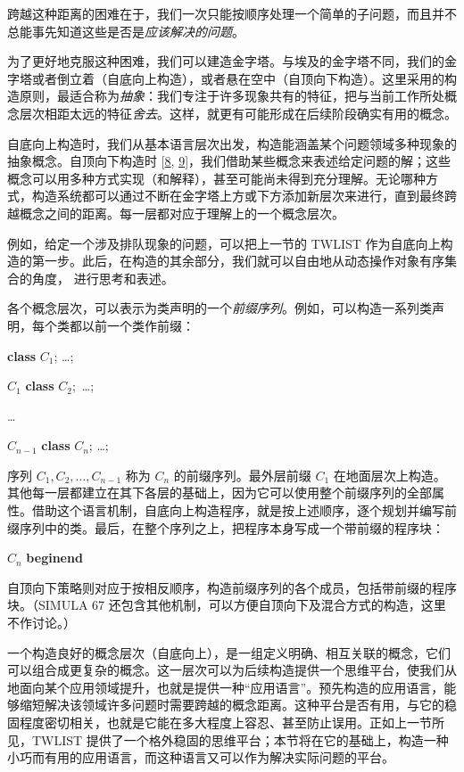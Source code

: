跨越这种距离的困难在于，我们一次只能按顺序处理一个简单的子问题，而且并不总能事先知道这些是否是\textit{应该解决的问题}。

为了更好地克服这种困难，我们可以建造金字塔。与埃及的金字塔不同，我们的金字塔或者倒立着（自底向上构造），或者悬在空中（自顶向下构造）。这里采用的构造原则，最适合称为\textit{抽象}：我们专注于许多现象共有的特征，把与当前工作所处概念层次相距太远的特征\textit{舍去}。这样，就更有可能形成在后续阶段确实有用的概念。

自底向上构造时，我们从基本语言层次出发，构造能涵盖某个问题领域多种现象的抽象概念。自顶向下构造时 [\hyperref[ref:8]{8}, \hyperref[ref:9]{9}]，我们借助某些概念来表述给定问题的解；这些概念可以用多种方式实现（和解释），甚至可能尚未得到充分理解。无论哪种方式，构造系统都可以通过不断在金字塔上方或下方添加新层次来进行，直到最终跨越概念之间的距离。每一层都对应于理解上的一个概念层次。

例如，给定一个涉及排队现象的问题，可以把上一节的 TWLIST 作为自底向上构造的第一步。此后，在构造的其余部分，我们就可以自由地从动态操作对象有序集合的角度，
进行思考和表述。

各个概念层次，可以表示为类声明的一个\textit{前缀序列}。例如，可以构造一系列类声明，每个类都以前一个类作前缀：

\hfill\textbf{class} $C_1$; \dots;\hspace{14em}

\hfill $C_1$ \textbf{class} $C_2;$ \dots;\hspace{14em}

\tabto*{13em}\dots

\hfill $C_{n - 1}$ \textbf{class} $C_n$; \dots;\hspace{14em}

\noindent
序列 $C_1, C_2, \dots, C_{n-1}$ 称为 $C_n$ 的前缀序列。最外层前缀 $C_1$ 在地面层次上构造。其他每一层都建立在其下各层的基础上，因为它可以使用整个前缀序列的全部属性。借助这个语言机制，自底向上构造程序，就是按上述顺序，逐个规划并编写前缀序列中的类。最后，在整个序列之上，把程序本身写成一个带前缀的程序块：

\quad $C_n$ \textbf{begin}\textemdash{}\textbf{end}

\noindent
自顶向下策略则对应于按相反顺序，构造前缀序列的各个成员，包括带前缀的程序块。（SIMULA 67 还包含其他机制，可以方便自顶向下及混合方式的构造，这里不作讨论。）

一个构造良好的概念层次（自底向上），是一组定义明确、相互关联的概念，它们可以组合成更复杂的概念。这一层次可以为后续构造提供一个思维平台，使我们从地面向某个应用领域提升，也就是提供一种“应用语言”。预先构造的应用语言，能够缩短解决该领域许多问题时需要跨越的概念距离。这种平台是否有用，与它的稳固程度密切相关，也就是它能在多大程度上容忍、甚至防止误用。正如上一节所见，TWLIST 提供了一个格外稳固的思维平台；本节将在它的基础上，构造一种小巧而有用的应用语言，而这种语言又可以作为解决实际问题的平台。

